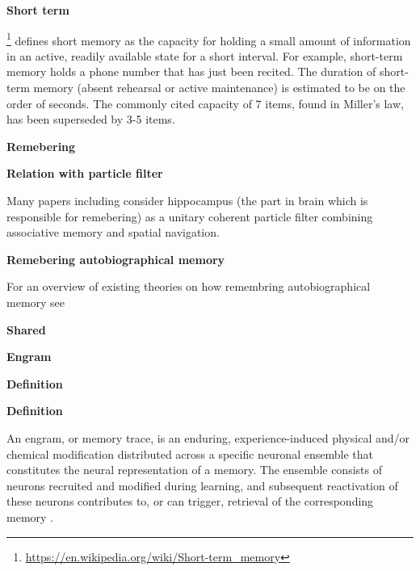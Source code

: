 \documentclass{book}
\providecommand{\ProjectDeepHeading}[2]{%
    \par\medskip\noindent\textbf{#2}\par\smallskip
}
\providecommand{\seeherefooter}[1]{\footnote{\url{#1}}}
\begin{document}
\ProjectDeepHeading{10}{Short term}


\seeherefooter{https://en.wikipedia.org/wiki/Short-term_memory} defines short memory as the capacity for holding a small amount of information in an active, readily available state for a short interval. For example, short-term memory holds a phone number that has just been recited. The duration of short-term memory (absent rehearsal or active maintenance) is estimated to be on the order of seconds. The commonly cited capacity of 7 items, found in Miller's law, has been superseded by 3-5 items.

\ProjectDeepHeading{6}{Remebering}


\ProjectDeepHeading{9}{Relation with particle filter}
        Many papers including \cite{fox-2010-learning-in-a-unitary-coherent-hippocampus} consider hippocampus (the part in brain which is responsible for remebering) as a unitary coherent particle filter combining associative memory and spatial navigation.
    
    
    \ProjectDeepHeading{9}{Remebering autobiographical memory}
        For an overview of existing theories on how remembring autobiographical memory see \cite{sheldon-2019-a-neurocognitive-perspective-on-the-forms-and-functions-of-autobiographical-memory-retrieval}

\ProjectDeepHeading{6}{Shared}

\ProjectDeepHeading{7}{Engram}


\ProjectDeepHeading{10}{Definition}
      \ProjectDeepHeading{10}{Definition}
      An engram, or memory trace, is an enduring, experience-induced physical and/or chemical modification distributed across a specific neuronal ensemble that constitutes the neural representation of a memory.
      The ensemble consists of neurons recruited and modified during learning, and subsequent reactivation of these neurons contributes to, or can trigger, retrieval of the corresponding memory \cite{josselyn-2020-memory-engrams-recalling-the-past-and-imagining-the-future,sakaguchi-2012-catching-the-engram-strategies-to-examine-the-memory-trace}.
\end{document}
